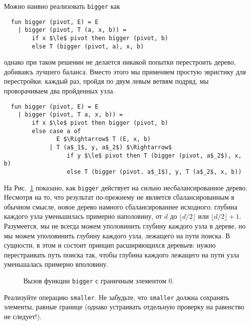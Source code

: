 Можно наивно реализовать \lstinline!bigger! как
\begin{lstlisting}
  fun bigger (pivot, E) = E
    | bigger (pivot, T (a, x, b)) =
        if x $\le$ pivot then bigger (pivot, b)
        else T (bigger (pivot, a), x, b)
\end{lstlisting}
однако при таком решении не делается никакой попытки перестроить
дерево, добиваясь лучшего баланса.  Вместо этого мы применяем простую
эвристику для перестройки: каждый раз, пройдя по двум левым ветвям
подряд, мы проворачиваем два пройденных узла.
\begin{lstlisting}
  fun bigger (pivot, E) = E
    | bigger (pivot, T a, x, b)) =
        if x $\le$ pivot then bigger (pivot, b)
        else case a of
               E $\Rightarrow$ T (E, x, b)
             | T (a$_1$, y, a$_2$) $\Rightarrow$
                  if y $\le$ pivot then T (bigger (pivot, a$_2$), x, b)
                  else T (bigger (pivot. a$_1$), y, T (a$_2$, x, b))
\end{lstlisting}
На Рис.~\ref{fig:5.4} показано, как \lstinline!bigger! действует на
сильно несбалансированное дерево. Несмотря на то, что результат
по-прежнему не является сбалансированным в обычном смысле, новое
дерево намного сбалансированнее исходного; глубина каждого узла
уменьшилась примерно наполовину, от $d$ до $\lfloor d/2 \rfloor$ или
$\lfloor d/2 \rfloor + 1$. Разумеется, мы не всегда можем уполовинить
глубину каждого узла в дереве, но мы можем уполовинить глубину каждого
узла, лежащего на пути поиска. В сущности, в этом и состоит принцип
расширяющихся деревьев: нужно перестраивать путь поиска так, чтобы
глубина каждого лежащего на пути узла уменьшалась примерно вполовину.

\begin{figure}
  \centering
  
  \caption{Вызов функции \lstinline!bigger! с граничным элементом 0.}
  \label{fig:5.4}
\end{figure}

\begin{exercise}\label{ex:5.4}
  Реализуйте операцию \lstinline!smaller!. Не забудьте, что
  \lstinline!smaller! должна сохранять элементы, равные границе (однако
   устраивать отдельную проверку на равенство не следует!).
\end{exercise}

